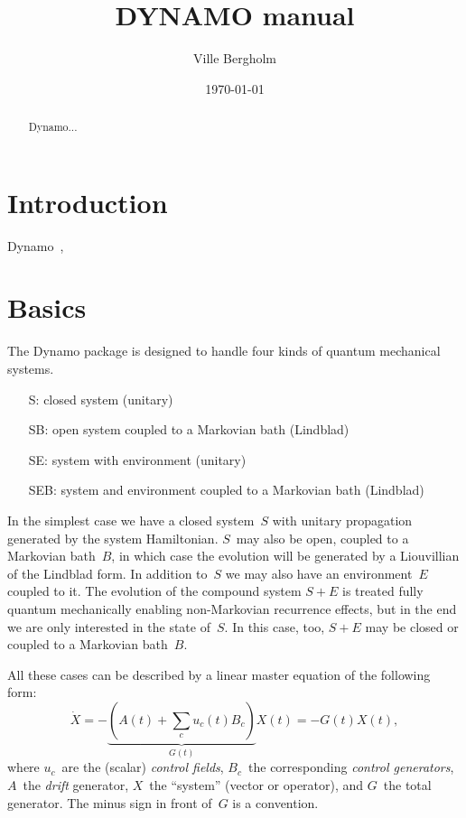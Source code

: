 \documentclass[aps, pra, a4paper, longbibliography]{revtex4}
\newcommand{\be}{\begin{equation}}
\newcommand{\ee}{\end{equation}}
\begin{document}
\title{DYNAMO manual}
\date{\today}

\author{Ville Bergholm}


\begin{abstract}
Dynamo...
\end{abstract}
\maketitle



\tableofcontents


\section{Introduction}

Dynamo~\cite{machnes_2011},



\section{Basics}
The Dynamo package is designed to handle four kinds of quantum
mechanical systems.
\begin{itemize}
\item[S:] closed system (unitary)
\item[SB:] open system coupled to a Markovian bath (Lindblad)
\item[SE:] system with environment (unitary)
\item[SEB:] system and environment coupled to a Markovian bath (Lindblad)
\end{itemize}
In the simplest case we have a closed system~$S$ with unitary
propagation generated by the system Hamiltonian.
$S$~may also be open, coupled to a Markovian bath~$B$, in which
case the evolution will be generated by a Liouvillian of the Lindblad form.
In addition to~$S$ we may also have an environment~$E$ coupled to
it. The evolution of the compound system $S+E$ is treated
fully quantum mechanically enabling non-Markovian recurrence effects,
but in the end we are only interested in the state of~$S$. In this
case, too, $S+E$ may be closed or coupled to a Markovian bath~$B$.

All these cases can be described by a linear master equation of the following form:
\be
\label{eq:master}
\dot{X} = -\underbrace{(A(t) +\sum_{c} u_c(t) B_c)}_{G(t)} X(t) = -G(t) X(t),
\ee
where $u_c$~are the (scalar) \emph{control fields}, $B_c$~the
corresponding \emph{control generators},
$A$~the \emph{drift} generator, $X$~the ``system'' (vector or operator), and $G$~the total generator.
The minus sign in front of~$G$ is a convention.
\end{document}
